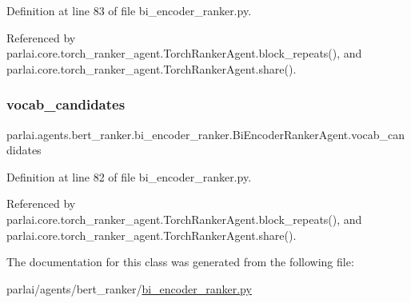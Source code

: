 Definition at line 83 of file bi\+\_\+encoder\+\_\+ranker.\+py.



Referenced by parlai.\+core.\+torch\+\_\+ranker\+\_\+agent.\+Torch\+Ranker\+Agent.\+block\+\_\+repeats(), and parlai.\+core.\+torch\+\_\+ranker\+\_\+agent.\+Torch\+Ranker\+Agent.\+share().

\mbox{\label{classparlai_1_1agents_1_1bert__ranker_1_1bi__encoder__ranker_1_1BiEncoderRankerAgent_a53592a01d59cee746172dcbc5e2282bf}} 
\subsubsection{\texorpdfstring{vocab\+\_\+candidates}{vocab\_candidates}}
{\footnotesize\ttfamily parlai.\+agents.\+bert\+\_\+ranker.\+bi\+\_\+encoder\+\_\+ranker.\+Bi\+Encoder\+Ranker\+Agent.\+vocab\+\_\+candidates}



Definition at line 82 of file bi\+\_\+encoder\+\_\+ranker.\+py.



Referenced by parlai.\+core.\+torch\+\_\+ranker\+\_\+agent.\+Torch\+Ranker\+Agent.\+block\+\_\+repeats(), and parlai.\+core.\+torch\+\_\+ranker\+\_\+agent.\+Torch\+Ranker\+Agent.\+share().



The documentation for this class was generated from the following file\+:\begin{DoxyCompactItemize}
\item 
parlai/agents/bert\+\_\+ranker/\hyperlink{bi__encoder__ranker_8py}{bi\+\_\+encoder\+\_\+ranker.\+py}\end{DoxyCompactItemize}
